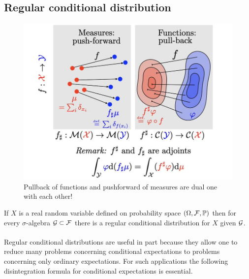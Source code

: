 \documentclass[10pt]{article}
\begin{document}
\subsection{Regular conditional distribution}  
\begin{figure}
    \centering
    \includegraphics[width=0.75\linewidth]{Figure/dual_measure_function.png}
    \caption{Pullback of functions and pushforward of measures are dual one with each other!}
\end{figure}
 If $X$ is a real random variable defined on probability space $(\Omega, \mathcal{F}, \mathop{\mathbb{P} \displaystyle})$ then for every $\sigma$-algebra $\mathcal{G} \subset \mathcal{F}$ there is a regular conditional distribution for $X$ given $\mathcal{G}$. \\~\\
Regular conditional distributions are useful in part because they allow one to reduce many
problems concerning conditional expectations to problems concerning only ordinary expectations. For such applications the following disintegration formula for conditional expectations
is essential. 
\end{document}
